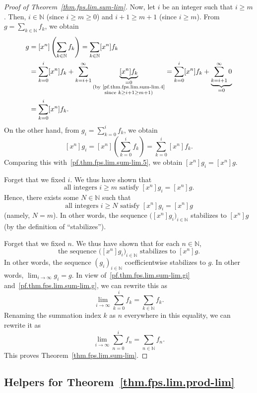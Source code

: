 \begin{proof}[Proof of Theorem~\ref{thm.fps.lim.sum-lim}]
Now, let $i$ be an integer such that $i\geq m$. Then,
$i\in\mathbb{N}$ (since $i\geq m\geq 0$) and $i+1\geq m+1$ (since
$i\geq m$). From $g = \sum_{k\in\mathbb{N}} f_k$, we obtain
\begin{align}
[x^n] g &= [x^n]\left(\sum_{k\in\mathbb{N}} f_k\right)
= \sum_{k\in\mathbb{N}} [x^n] f_k \nonumber\\
&= \sum_{k=0}^{i} [x^n] f_k + \sum_{k=i+1}^{\infty}
\underbrace{[x^n] f_k}_{\substack{= 0 \\ \text{(by~\eqref{pf.thm.fps.lim.sum-lim.4}} \\ \text{since } k\geq i+1\geq m+1\text{)}}}
= \sum_{k=0}^{i} [x^n] f_k + \underbrace{\sum_{k=i+1}^{\infty} 0}_{=0} \nonumber\\
&= \sum_{k=0}^{i} [x^n] f_k.
\label{pf.thm.fps.lim.sum-lim.5}
\end{align}
On the other hand, from $g_i = \sum_{k=0}^{i} f_k$, we obtain
\[
[x^n] g_i = [x^n]\left(\sum_{k=0}^{i} f_k\right)
= \sum_{k=0}^{i} [x^n] f_k.
\]
Comparing this with~\eqref{pf.thm.fps.lim.sum-lim.5}, we obtain
$[x^n] g_i = [x^n] g$.

Forget that we fixed $i$. We thus have shown that
\[
\text{all integers } i\geq m \text{ satisfy } [x^n] g_i = [x^n] g.
\]
Hence, there exists some $N\in\mathbb{N}$ such that
\[
\text{all integers } i\geq N \text{ satisfy } [x^n] g_i = [x^n] g
\]
(namely, $N = m$). In other words, the sequence
$\bigl([x^n] g_i\bigr)_{i\in\mathbb{N}}$ stabilizes to $[x^n] g$
(by the definition of ``stabilizes'').

Forget that we fixed $n$. We thus have shown that for each
$n\in\mathbb{N}$,
\[
\text{the sequence } \bigl([x^n] g_i\bigr)_{i\in\mathbb{N}}
\text{ stabilizes to } [x^n] g.
\]
In other words, the sequence $(g_i)_{i\in\mathbb{N}}$ coefficientwise
stabilizes to $g$. In other words, $\lim_{i\to\infty} g_i = g$.
In view of~\eqref{pf.thm.fps.lim.sum-lim.gi}
and~\eqref{pf.thm.fps.lim.sum-lim.g}, we can rewrite this as
\[
\lim_{i\to\infty} \sum_{k=0}^{i} f_k = \sum_{k\in\mathbb{N}} f_k.
\]
Renaming the summation index $k$ as $n$ everywhere in this equality,
we can rewrite it as
\[
\lim_{i\to\infty} \sum_{n=0}^{i} f_n = \sum_{n\in\mathbb{N}} f_n.
\]
This proves Theorem~\ref{thm.fps.lim.sum-lim}.
\end{proof}

\subsection{Helpers for Theorem~\ref{thm.fps.lim.prod-lim}}

